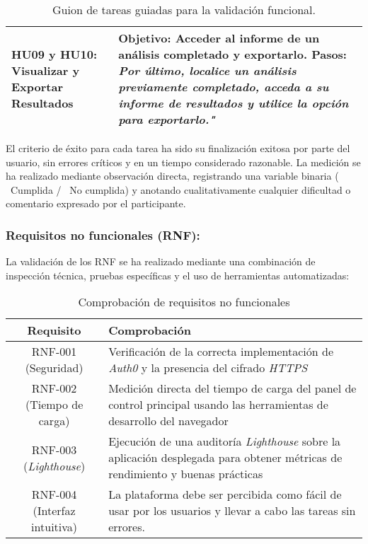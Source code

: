 \begin{table}[H]
\begin{tabularx}{\textwidth}{XX}
        \textbf{HU09 y HU10: Visualizar y Exportar Resultados} & 
        \textbf{Objetivo:} Acceder al informe de un análisis completado y exportarlo. \newline
        \textbf{Pasos: }\textit{Por último, localice un análisis previamente completado, acceda a su informe de resultados y utilice la opción para exportarlo."} \\
        \bottomrule
    \end{tabularx}
    \caption{Guion de tareas guiadas para la validación funcional.}
    \label{tab:validacion-funcional}
\end{table}

El criterio de éxito para cada tarea ha sido su finalización exitosa por parte del usuario, sin errores críticos y en un tiempo considerado razonable. La medición se ha realizado mediante observación directa, registrando una variable binaria ( \cmark\ Cumplida / \xmark\ No cumplida) y anotando cualitativamente cualquier dificultad o comentario expresado por el participante.

\subsubsection{Requisitos no funcionales (RNF):}
La validación de los RNF se ha realizado mediante una combinación de inspección técnica, pruebas específicas y el uso de herramientas automatizadas:

\renewcommand{\arraystretch}{1.3} %
\begin{table}[H]
    \centering
    \small
    \begin{tabularx}{1\textwidth}{cX}
        \toprule
        \textbf{Requisito} & \textbf{Comprobación} \\
        \midrule
        RNF-001 (Seguridad) & Verificación de la correcta implementación de \textit{Auth0} y la presencia del cifrado \textit{HTTPS} \\
        RNF-002 (Tiempo de carga) & Medición directa del tiempo de carga del panel de control principal usando las herramientas de desarrollo del navegador \\
        RNF-003 (\textit{Lighthouse}) & Ejecución de una auditoría \textit{Lighthouse} sobre la aplicación desplegada para obtener métricas de rendimiento y buenas prácticas \\
        RNF-004 (Interfaz intuitiva) & La plataforma debe ser percibida como fácil de usar por los usuarios y llevar a cabo las tareas sin errores.\\

        \bottomrule
    \end{tabularx}
    \caption{Comprobación de requisitos no funcionales}
    \label{tab:validacion-RNF}
\end{table}


